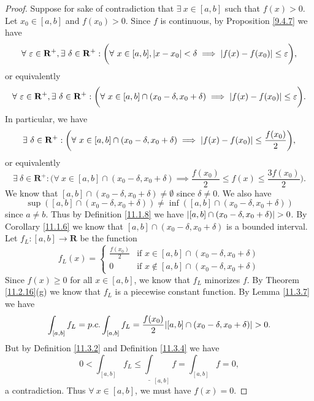\begin{proof}
    Suppose for sake of contradiction that \(\exists\ x \in [a, b]\) such that \(f(x) > 0\).
    Let \(x_0 \in [a, b]\) and \(f(x_0) > 0\).
    Since \(f\) is continuous, by Proposition \ref{9.4.7} we have
    \[
        \forall\ \varepsilon \in \mathbf{R}^+, \exists\ \delta \in \mathbf{R}^+ : \bigg(\forall\ x \in [a, b], \abs*{x - x_0} < \delta \implies \abs*{f(x) - f(x_0)} \leq \varepsilon\bigg),
    \]
    or equivalently
    \[
        \forall\ \varepsilon \in \mathbf{R}^+, \exists\ \delta \in \mathbf{R}^+ : \bigg(\forall\ x \in [a, b] \cap (x_0 - \delta, x_0 + \delta) \implies \abs*{f(x) - f(x_0)} \leq \varepsilon\bigg).
    \]
    In particular, we have
    \[
        \exists\ \delta \in \mathbf{R}^+ : \bigg(\forall\ x \in [a, b] \cap (x_0 - \delta, x_0 + \delta) \implies \abs*{f(x) - f(x_0)} \leq \frac{f(x_0)}{2}\bigg),
    \]
    or equivalently
    \[
        \exists\ \delta \in \mathbf{R}^+ : \bigg(\forall\ x \in [a, b] \cap (x_0 - \delta, x_0 + \delta) \implies \frac{f(x_0)}{2} \leq f(x) \leq \frac{3 f(x_0)}{2}\bigg).
    \]
    We know that \([a, b] \cap (x_0 - \delta, x_0 + \delta) \neq \emptyset\) since \(\delta \neq 0\).
    We also have
    \[
        \sup([a, b] \cap (x_0 - \delta, x_0 + \delta)) \neq \inf([a, b] \cap (x_0 - \delta, x_0 + \delta))
    \]
    since \(a \neq b\).
    Thus by Definition \ref{11.1.8} we have \(\abs*{[a, b] \cap (x_0 - \delta, x_0 + \delta)} > 0\).
    By Corollary \ref{11.1.6} we know that \([a, b] \cap (x_0 - \delta, x_0 + \delta)\) is a bounded interval.
    Let \(f_L : [a, b] \to \mathbf{R}\) be the function
    \[
        f_L(x) = \begin{cases}
            \frac{f(x_0)}{2} & \text{if } x \in [a, b] \cap (x_0 - \delta, x_0 + \delta)    \\
            0                & \text{if } x \notin [a, b] \cap (x_0 - \delta, x_0 + \delta)
        \end{cases}
    \]
    Since \(f(x) \geq 0\) for all \(x \in [a, b]\), we know that \(f_L\) minorizes \(f\).
    By Theorem \ref{11.2.16}(g) we know that \(f_L\) is a piecewise constant function.
    By Lemma \ref{11.3.7} we have
    \[
        \int_{[a, b]} f_L = p.c. \int_{[a, b]} f_L = \frac{f(x_0)}{2}\abs*{[a, b] \cap (x_0 - \delta, x_0 + \delta)} > 0.
    \]
    But by Definition \ref{11.3.2} and Definition \ref{11.3.4} we have
    \[
        0 < \int_{[a, b]} f_L \leq \underline{\int}_{[a, b]} f = \int_{[a, b]} f = 0,
    \]
    a contradiction.
    Thus \(\forall\ x \in [a, b]\), we must have \(f(x) = 0\).
\end{proof}

